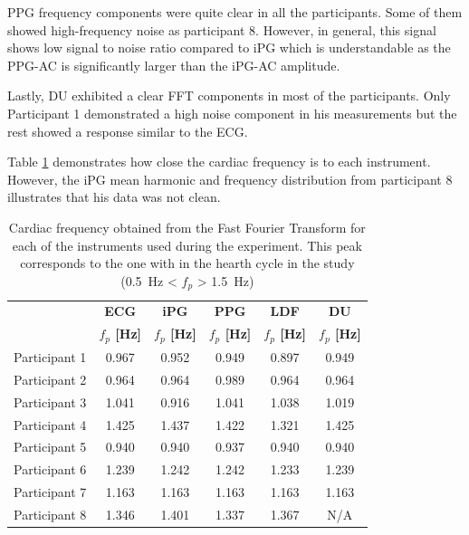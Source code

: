 PPG frequency components were quite clear in all the participants. Some of them showed high-frequency noise as participant 8. However, in general, this signal shows low signal to noise ratio compared to iPG which is understandable as the PPG-AC is significantly larger than the iPG-AC amplitude.

Lastly, DU exhibited a clear FFT components in most of the participants. Only Participant 1 demonstrated a high noise component in his measurements but the rest showed a response similar to the ECG. 

Table \ref{tbl:fft} demonstrates how close the cardiac frequency is to each instrument. However, the iPG mean harmonic and frequency distribution from participant 8 illustrates that his data was not clean.


\begin{table}[!htbp]
	\caption[Peak frequency calculated obtained form Fast Fourier Transform]{Cardiac frequency obtained from the Fast Fourier Transform for each of the instruments used during the experiment. This peak corresponds to the one with in the hearth cycle in the study (\SI{0.5}{\hertz} < $f_p$ > \SI{1.5}{\hertz})}
	\label{tbl:fft}
	\centering 
	\begin{tabular}{lccccc}
		\toprule
		& \textbf{ECG}
		& \textbf{iPG}
		& \textbf{PPG}
		& \textbf{LDF}
		& \textbf{DU} \\
		& \textbf{$f_p$ [\si{\hertz}]}		
		& \textbf{$f_p$ [\si{\hertz}]}		
		& \textbf{$f_p$ [\si{\hertz}]}
		& \textbf{$f_p$ [\si{\hertz}]}
		& \textbf{$f_p$ [\si{\hertz}]}\\\midrule
	    Participant 1    &     0.967    &     0.952    &     0.949    &     0.897    &     0.949    \\  
		Participant 2    &     0.964    &     0.964    &     0.989    &     0.964    &     0.964    \\  
		Participant 3    &     1.041    &     0.916    &     1.041    &     1.038    &     1.019    \\  
		Participant 4    &     1.425    &     1.437    &     1.422    &     1.321    &     1.425    \\  
		Participant 5    &     0.940    &     0.940    &     0.937    &     0.940    &     0.940    \\  
		Participant 6    &     1.239    &     1.242    &     1.242    &     1.233    &     1.239    \\  
		Participant 7    &     1.163    &     1.163    &     1.163    &     1.163    &     1.163    \\  
		Participant 8    &     1.346    &     1.401    &     1.337    &     1.367    &     N/A    \\  
 
	\bottomrule
	\end{tabular}
\end{table}


